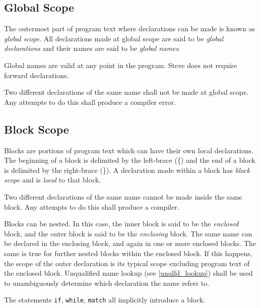 \subsection{Global Scope} \label{global_scope}

The outermost part of program text where declarations can be made is known as \textit{global scope}. All declarations made at global scope are said to be \textit{global declarations} and their names are said to be \textit{global names}.

Global names are valid at any point in the program. Steve does not require forward declarations. 

Two different declarations of the same name shall not be made at global scope. Any attempts to do this shall produce a compiler error.

\subsection{Block Scope} \label{block_scope}

Blocks are portions of program text which can have their own local declarations. The beginning of a block is delimited by the left-brace (\{) and the end of a block is delimited by the right-brace (\}). A declaration made within a block has \textit{block scope} and is \textit{local} to that block.

Two different declarations of the same name cannot be made inside the same block. Any attempts to do this shall produce a compiler. 

Blocks can be nested. In this case, the inner block is said to be the \textit{enclosed} block, and the outer block is said to be the \textit{enclosing} block. The same name can be declared in the enclosing block, and again in one or more enclosed blocks. The same is true for further nested blocks within the enclosed block. If this happens, the scope of the outer declaration is its typical scope excluding program text of the enclosed block. Unqualified name lookup (see \ref{unqlfd_lookup}) shall be used to unambiguously determine which declaration the name refers to. 

The statements \texttt{if}, \texttt{while}, \texttt{match} all implicitly introduce a block.


